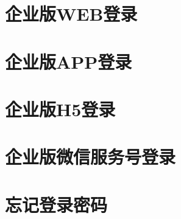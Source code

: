 
\section{企业版WEB登录} 
\label{sec:login_web}


\section{企业版APP登录} 
\label{sec:login_app}


\section{企业版H5登录} 
\label{sec:login_h5}


\clearpage
\section{企业版微信服务号登录} 
\label{sec:login_wx}


\section{忘记登录密码} 
\label{sec:login_passwd}


